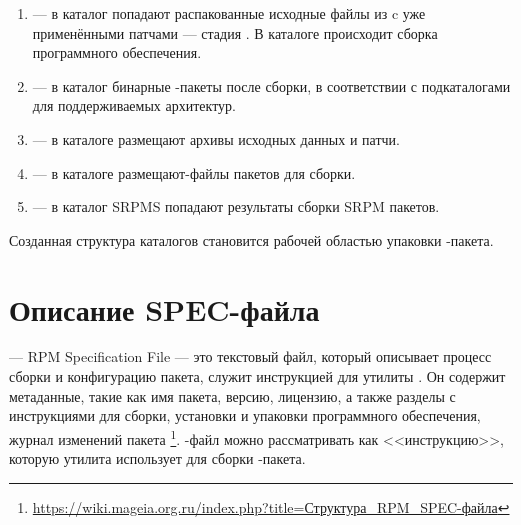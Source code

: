 \begin{enumerate}
	\item {} --- в каталог попадают распакованные исходные файлы из 
		 c уже применёнными патчами --- стадия . 
		В каталоге  происходит сборка программного обеспечения.
	\item {} --- в каталог  бинарные -пакеты после 
		сборки, в соответствии с подкаталогами для поддерживаемых архитектур.
	\item {} --- в каталоге размещают архивы исходных данных и патчи.
	\item {} --- в каталоге размещают-файлы пакетов для сборки.
	\item {} --- в каталог SRPMS попадают результаты сборки SRPM пакетов.
\end{enumerate}

Созданная структура каталогов становится рабочей областью упаковки -пакета.



\section{Описание SPEC-файла}
 --- RPM Specification File --- это текстовый файл, который описывает процесс сборки и конфигурацию 
пакета, служит инструкцией для утилиты . Он содержит метаданные, такие как имя пакета, версию, 
лицензию, а также разделы с инструкциями для сборки, установки и упаковки программного обеспечения, журнал 
изменений пакета%
\footnote{\href{https://wiki.mageia.org.ru/index.php?title=\%D0\%A1\%D1\%82\%D1\%80\%D1\%83\%D0\%BA\%D1\%82\%D1\%83\%D1\%80\%D0\%B0_RPM_SPEC-\%D1\%84\%D0\%B0\%D0\%B9\%D0\%BB\%D0\%B0}%
{https://wiki.mageia.org.ru/index.php?title=Структура\_RPM\_SPEC-файла}}. %
-файл можно рассматривать как <<инструкцию>>, которую утилита  использует для сборки -пакета.

